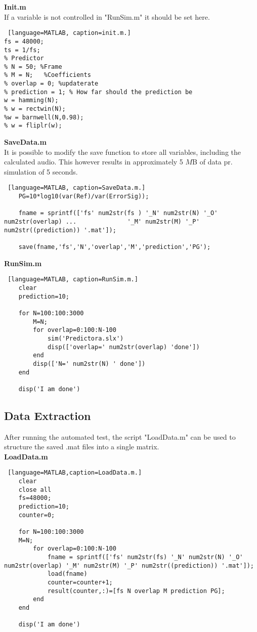 \textbf{Init.m}\\
If a variable is not controlled in "RunSim.m" it should be set here. 
\begin{lstlisting} [language=MATLAB, caption=init.m.]
fs = 48000;
ts = 1/fs; 
% Predictor 
% N = 50; %Frame
% M = N;   %Coefficients
% overlap = 0; %updaterate
% prediction = 1; % How far should the prediction be
w = hamming(N); 
% w = rectwin(N);
%w = barnwell(N,0.98);
% w = fliplr(w);
\end{lstlisting}

\textbf{SaveData.m}\\
It is possible to modify the save function to store all variables, including the calculated audio. This however results in approximately 5 $M$B of data pr. simulation of 5 seconds.  
\begin{lstlisting} [language=MATLAB, caption=SaveData.m.]
	PG=10*log10(var(Ref)/var(ErrorSig));
	
	fname = sprintf(['fs' num2str(fs ) '_N' num2str(N) '_O' num2str(overlap) ...              '_M' num2str(M) '_P' num2str((prediction)) '.mat']);
	
	save(fname,'fs','N','overlap','M','prediction','PG');
\end{lstlisting}

\textbf{RunSim.m}
\begin{lstlisting} [language=MATLAB, caption=RunSim.m.]
	clear 
	prediction=10;
	
	for N=100:100:3000
		M=N;
		for overlap=0:100:N-100
			sim('Predictora.slx')
			disp(['overlap=' num2str(overlap) 'done'])
		end
		disp(['N=' num2str(N) ' done'])
	end
	
	disp('I am done')	
\end{lstlisting}

\subsection{Data Extraction}
After running the automated test, the script "LoadData.m" can be used to structure the saved .mat files into a single matrix.\\
\textbf{LoadData.m}
\begin{lstlisting} [language=MATLAB,caption=LoadData.m.]
	clear
	close all
	fs=48000;
	prediction=10;
	counter=0;
	
	for N=100:100:3000
	M=N;
		for overlap=0:100:N-100
			fname = sprintf(['fs' num2str(fs) '_N' num2str(N) '_O' num2str(overlap) '_M' num2str(M) '_P' num2str((prediction)) '.mat']);
			load(fname)
			counter=counter+1;
			result(counter,:)=[fs N overlap M prediction PG]; 
		end
	end
	
	disp('I am done')
\end{lstlisting}

